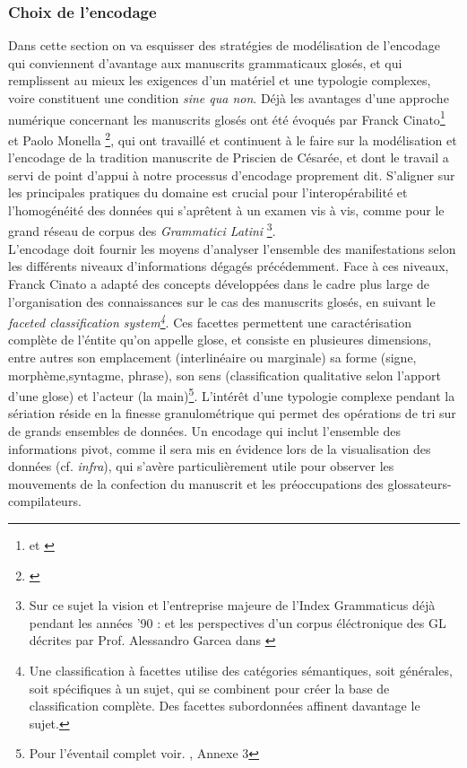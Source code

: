 \documentclass[a4paper, twoside, 12pt]{book}
\begin{document}
\subsubsection{Choix de l'encodage}

Dans cette section on va esquisser des stratégies de modélisation de l'encodage qui conviennent d'avantage aux manuscrits grammaticaux glosés, et qui remplissent au mieux les exigences d’un matériel et une typologie complexes, voire constituent une condition \textit{sine qua non}. Déjà les avantages d'une approche numérique concernant les manuscrits glosés ont été évoqués par Franck Cinato\footnote{\cite{cinato2015priscien} et \cite{cinato2011perspectives}} et Paolo Monella \footnote{\cite{monella2019digital}}, qui ont travaillé et continuent à le faire sur la modélisation et l'encodage de la tradition manuscrite de Priscien de Césarée, et dont le travail a servi de point d'appui à notre processus d'encodage proprement dit. S'aligner sur les principales pratiques du domaine est crucial pour l'interopérabilité et l'homogénéité des données qui s'aprêtent à un examen vis à vis, comme pour le grand réseau de corpus des \textit{Grammatici Latini} \footnote{ Sur ce sujet la vision et l'entreprise majeure de l'Index Grammaticus déjà pendant les années '90 : \cite{lomanto1990index} et les perspectives d'un corpus éléctronique des GL décrites par Prof. Alessandro Garcea dans \cite{garcea2010corpus}}.\\

L'encodage doit fournir les moyens d’analyser l’ensemble des manifestations selon les différents niveaux d’informations dégagés précédemment. Face à ces niveaux, Franck Cinato a adapté des concepts développées dans le cadre plus large de l’organisation des connaissances sur le cas des manuscrits glosés, en suivant le \textit{faceted classification system\footnote{Une classification à facettes utilise des catégories sémantiques, soit générales, soit spécifiques à un sujet, qui se combinent pour créer la base de classification complète. Des facettes subordonnées affinent davantage le sujet.}}. Ces facettes permettent une caractérisation complète de l'éntite qu'on appelle glose, et consiste en plusieures dimensions, entre autres son emplacement (interlinéaire ou marginale) sa forme (signe, morphème,syntagme, phrase), son sens (classification qualitative selon l'apport d'une glose) et l'acteur (la main)\footnote{Pour l'éventail complet voir. \cite{cinato2015priscien}, Annexe 3}. L’intérêt d'une typologie complexe pendant la sériation réside en la  \og{}finesse granulométrique\fg{} qui permet des opérations de tri sur de grands ensembles de données. Un encodage qui inclut l'ensemble des informations pivot, comme il sera mis en évidence lors de la visualisation des données (cf. \textit{infra}), qui s'avère particulièrement utile pour observer les mouvements de la confection du manuscrit et les préoccupations des glossateurs-compilateurs.\\
\end{document}
